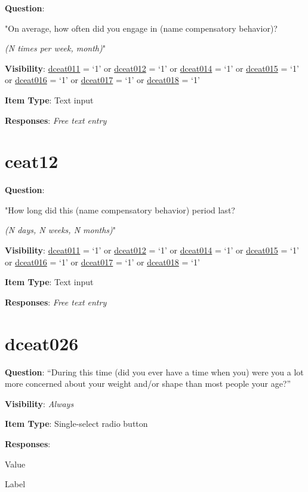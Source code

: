 \documentclass[]{book}
\begin{document}
\textbf{Question}:

"On average, how often did you engage in (name compensatory behavior)?

\emph{(N times per week, month)}"

\textbf{Visibility}: \protect\hyperlink{dceat011}{dceat011} = `1' or \protect\hyperlink{dceat012}{dceat012} = `1' or \protect\hyperlink{dceat014}{dceat014} = `1' or \protect\hyperlink{dceat015}{dceat015} = `1' or \protect\hyperlink{dceat016}{dceat016} = `1' or \protect\hyperlink{dceat017}{dceat017} = `1' or \protect\hyperlink{dceat018}{dceat018} = `1'

\textbf{Item Type}: Text input

\textbf{Responses}: \emph{Free text entry}

\hypertarget{ceat12}{%
\section{ceat12}\label{ceat12}}

\textbf{Question}:

"How long did this (name compensatory behavior) period last?

\emph{(N days, N weeks, N months)}"

\textbf{Visibility}: \protect\hyperlink{dceat011}{dceat011} = `1' or \protect\hyperlink{dceat012}{dceat012} = `1' or \protect\hyperlink{dceat014}{dceat014} = `1' or \protect\hyperlink{dceat015}{dceat015} = `1' or \protect\hyperlink{dceat016}{dceat016} = `1' or \protect\hyperlink{dceat017}{dceat017} = `1' or \protect\hyperlink{dceat018}{dceat018} = `1'

\textbf{Item Type}: Text input

\textbf{Responses}: \emph{Free text entry}

\hypertarget{dceat026}{%
\section{dceat026}\label{dceat026}}

\textbf{Question}: ``During this time (did you ever have a time when you) were you a lot more concerned about your weight and/or shape than most people your age?''

\textbf{Visibility}: \emph{Always}

\textbf{Item Type}: Single-select radio button

\textbf{Responses}:

Value

Label
\end{document}

